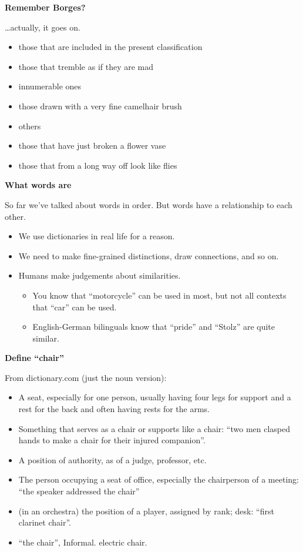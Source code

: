 \documentclass{beamer}
\newcommand{\pagestepalt}[2]{
  \begin{frame}[t]
    \begin{minipage}[t][0.26\textheight][t]{\textwidth}
      \begin{center}
        \huge
        \textbf{#1}
      \end{center}
    \end{minipage}
    
    \begin{minipage}[t][0.7\textheight][c]{\textwidth}
      #2
    \end{minipage}
  \end{frame}
}
\begin{document}
\pagestepalt{Remember Borges?}{
  \ldots actually, it goes on.
    \begin{itemize}
    \item those that are included in the present classification
    \item those that tremble as if they are mad
    \item innumerable ones
    \item those drawn with a very fine camelhair brush
    \item others
    \item those that have just broken a flower vase
    \item those that from a long way off look like flies
    \end{itemize}
}

\pagestepalt{What words are}{
  So far we've talked about words in order.  But words have a
  relationship to each other.
  \begin{itemize}
  \item We use dictionaries in real life for a reason.
  \item We need to make fine-grained distinctions, draw connections,
    and so on.
  \item Humans make judgements about similarities.  
    \begin{itemize}
    \item You know that ``motorcycle'' can be used in most, but not all
      contexts that ``car'' can be used.
    \item English-German bilinguals know that ``pride'' and ``Stolz'' are quite similar.
    \end{itemize}
  \end{itemize}
}


\pagestepalt{Define ``chair''}{
  From dictionary.com (just the noun version):\pause
  \begin{itemize}
  \item A seat, especially for one person, usually having four legs
    for support and a rest for the back and often having rests for the arms.
  \item Something that serves as a chair or supports like a chair:
    ``two men clasped hands to make a chair for their injured companion''.
  \item A position of authority, as of a judge, professor, etc.
  \item The person occupying a seat of office, especially the chairperson
    of a meeting: ``the speaker addressed the chair''
  \item (in an orchestra) the position of a player, assigned by rank; desk:
    ``first clarinet chair''.
  \item ``the chair'', Informal. electric chair.
  \end{itemize}
}
\end{document}

